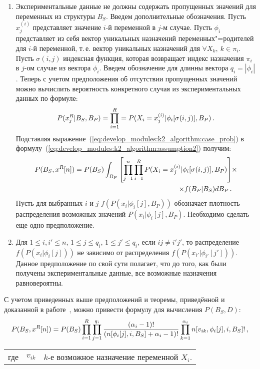 \begin{enumerate}
  \item
  Экспериментальные данные не должны содержать пропущенных значений для переменных из структуры $B_S$.
  Введем дополнительные обозначения.
  Пусть $x_j^{(i)}$ представляет значение $i$-й переменной в $j$-м случае.
  Пусть $\phi_i$ представляет из себя вектор уникальных назначений переменных"=родителей для $i$-й переменной, т.\,е. вектор уникальных назначений для $ \forall X_k,\ k \in \pi_i$.
  Пусть $\sigma(i, j)$ индексная функция, которая возвращает индекс назначения $\pi_i$ в $j$-ом случае из вектора $\phi_i$.
  Введем обозначение для длинны вектора $q_i = | \phi_i |$.
  Теперь с учетом предположения об отсутствии пропущенных значений можно вычислить вероятность конкретного случая из экспериментальных данных по формуле:
  \begin{equation}
    \label{eq:develop_modules:k2_algorithm:case_prob}
    P(x^R_j | B_S, B_P) =
      \prod_{i = 1}^{R} = P(X_i = x_j^{(i)} | \phi_i[\sigma(i, j)], B_P) \text{\,.}
  \end{equation}
  Подставляя выражение~(\ref{eq:develop_modules:k2_algorithm:case_prob}) в формулу~(\ref{eq:develop_modules:k2_algorithm:assumption2}) получим:
  \begin{align}
    \label{eq:develop_modules:k2_algorithm:assumption3}
    P(B_S, x^R[n]) =
      P(B_S)
      \int_{B_P}\left[ \prod_{j = 1}^{n}\prod_{i = 1}^{R} P(X_i = x_j^{(i)} | \phi_i[\sigma(i, j)], B_P)  \right] &\times \notag\\
      \times f(B_P | B_S) dB_P \text{\,.}
  \end{align}
  Пусть для выбранных $i$ и $j$ $f(P(x_i | \phi_i[j], B_P))$ обозначает плотность распределения возможных значений $P(x_i | \phi_i[j], B_P)$.
  Необходимо сделать еще одно предположение.

  \item Для $ 1 \le i, i' \le n$, $ 1 \le j \le q_i $, $1 \le j' \le q_i $, если
  $ij \neq i'j'$, то распределение $f(P(x_i | \phi_i[j]))$ не зависимо от распределения $f(P(x_{i'} | \phi_{i'}[{j'}]))$.
  Данное предположение по свой сути полагает, что до того, как были получены экспериментальные данные, все возможные назначения равновероятны.
\end{enumerate}

С учетом приведенных выше предположений и теоремы, приведённой и доказанной в работе~\cite{Cooper1991}, можно привести формулу для вычисления $P(B_S, D)$:
\begin{equation}
  \label{eq:develop_modules:k2_algorithm:model_and_data_prob}
  P(B_S, x^R[n]) =
    P(B_S)
    \prod_{i = 1}^{R}
    \prod_{j = 1}^{q_i}
    \frac{(\alpha_i - 1)!}
         {(n[\phi_i[j], i, B_S] + \alpha_i - 1)!}
    \prod_{k = 1}^{\alpha_i}
      n[v_{ik}, \phi_i[j], i, B_S]! \text{\,,}
\end{equation}
\par
\begin{tabular}{@{}ll@{ --- }p{}}
где & $ v_{ik} $ & $k$-е возможное назначение переменной $X_i$. \\[\parsep]
\end{tabular}

